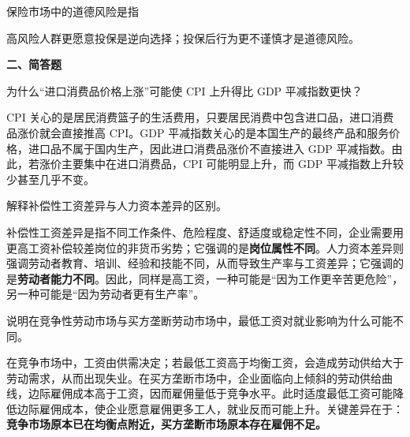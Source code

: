 \begin{question}
保险市场中的道德风险是指
\begin{choiceoptions}[2]
\end{choiceoptions}
\begin{solution}
高风险人群更愿意投保是逆向选择；投保后行为更不谨慎才是道德风险。
\end{solution}
\end{question}

\textbf{二、简答题}

\begin{question}
为什么“进口消费品价格上涨”可能使 CPI 上升得比 GDP 平减指数更快？

\begin{solution}
CPI 关心的是居民消费篮子的生活费用，只要居民消费中包含进口品，进口消费品涨价就会直接推高 CPI。GDP 平减指数关心的是本国生产的最终产品和服务价格，进口品不属于国内生产，因此进口消费品涨价不直接进入 GDP 平减指数。由此，若涨价主要集中在进口消费品，CPI 可能明显上升，而 GDP 平减指数上升较少甚至几乎不变。
\end{solution}
\end{question}

\begin{question}
解释补偿性工资差异与人力资本差异的区别。

\begin{solution}
补偿性工资差异是指不同工作条件、危险程度、舒适度或稳定性不同，企业需要用更高工资补偿较差岗位的非货币劣势；它强调的是\textbf{岗位属性不同}。人力资本差异则强调劳动者教育、培训、经验和技能不同，从而导致生产率与工资差异；它强调的是\textbf{劳动者能力不同}。因此，同样是高工资，一种可能是“因为工作更辛苦更危险”，另一种可能是“因为劳动者更有生产率”。
\end{solution}
\end{question}

\begin{question}
说明在竞争性劳动市场与买方垄断劳动市场中，最低工资对就业影响为什么可能不同。

\begin{solution}
在竞争市场中，工资由供需决定；若最低工资高于均衡工资，会造成劳动供给大于劳动需求，从而出现失业。在买方垄断市场中，企业面临向上倾斜的劳动供给曲线，边际雇佣成本高于工资，因而雇佣量低于竞争水平。此时适度最低工资可能降低边际雇佣成本，使企业愿意雇佣更多工人，就业反而可能上升。关键差异在于：\textbf{竞争市场原本已在均衡点附近，买方垄断市场原本存在雇佣不足。}
\end{solution}
\end{question}

